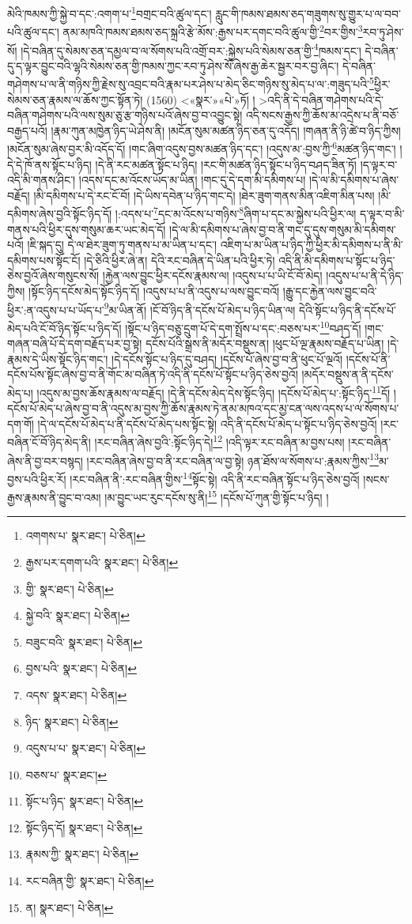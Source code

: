 མེའི་ཁམས་ཀྱི་སྐྱེ་བ་དང་:འགག་པ་\footnote{འགགས་པ་  སྣར་ཐང་།  པེ་ཅིན། }བགྲང་བའི་ཚུལ་དང་། རླུང་གི་ཁམས་ཐམས་ཅད་གཟུགས་སུ་གྱུར་པ་ལ་བབ་པའི་ཚུལ་དང་། ནམ་མཁའི་ཁམས་ཐམས་ཅད་སྐྲའི་རྩེ་མོས་:རྒྱས་པར་དགང་བའི་ཚུལ་གྱི་\footnote{རྒྱས་པར་དགག་པའི་  སྣར་ཐང་།  པེ་ཅིན། }བར་གྱིས་\footnote{གྱི་  སྣར་ཐང་།  པེ་ཅིན། }རབ་ཏུ་ཤེས་སོ། །དེ་བཞིན་དུ་སེམས་ཅན་དམྱལ་བ་ལ་སོགས་པའི་འགྲོ་བར་:སྐྱེས་པའི་སེམས་ཅན་གྱི་\footnote{སྐྱེ་བའི་  སྣར་ཐང་།  པེ་ཅིན། }ཁམས་དང་། དེ་བཞིན་དུ་ད་ལྟར་བྱུང་བའི་ལྷའི་སེམས་ཅན་གྱི་ཁམས་ཀྱང་རབ་ཏུ་ཤེས་སོ་ཞེས་རྒྱ་ཆེར་སྦྱར་བར་བྱ་ཞིང་། དེ་བཞིན་གཤེགས་པ་ལ་ནི་གཉིས་ཀྱི་རྗེས་སུ་འབྲང་བའི་རྣམ་པར་ཤེས་པ་མེད་ཅིང་གཉིས་སུ་མེད་པ་ལ་:གཟུད་པའི་\footnote{བཟུང་བའི་  སྣར་ཐང་།  པེ་ཅིན། }ཕྱིར་སེམས་ཅན་རྣམས་ལ་ཆོས་ཀྱང་སྟོན་ཏེ། (1560) <«སྣར་»«པེ་»ཏོ། །
 >འདི་ནི་དེ་བཞིན་གཤེགས་པའི་དེ་བཞིན་གཤེགས་པའི་ལས་སུམ་ཅུ་རྩ་གཉིས་པའོ་ཞེས་བྱ་བ་འབྱུང་སྟེ། འདི་སངས་རྒྱས་ཀྱི་ཆོས་མ་འདྲེས་པ་ནི་བཅོ་བརྒྱད་པའོ། །རྣམ་ཀུན་མཁྱེན་ཉིད་ཡེ་ཤེས་ནི། །མངོན་སུམ་མཚན་ཉིད་ཅན་དུ་འདོད། །གཞན་ནི་ཉི་ཚེ་བ་ཉིད་ཀྱིས། །མངོན་སུམ་ཞེས་བྱར་མི་འདོད་དོ། །གང་ཞིག་འདུས་བྱས་མཚན་ཉིད་དང་། །འདུས་མ་:བྱས་ཀྱི་\footnote{བྱས་པའི་  སྣར་ཐང་།  པེ་ཅིན། }མཚན་ཉིད་གང་། །དེ་དེ་ཁོ་ནས་སྟོང་པ་ཉིད། །དེ་ནི་རང་མཚན་སྟོང་པ་ཉིད། །རང་གི་མཚན་ཉིད་སྟོང་པ་ཉིད་བཤད་ཟིན་ཏོ། །ད་ལྟར་བ་འདི་མི་གནས་ཤིང་། །འདས་དང་མ་འོངས་ཡོད་མ་ཡིན། །གང་དུ་དེ་དག་མི་དམིགས་པ། །དེ་ལ་མི་དམིགས་པ་ཞེས་བརྗོད། །མི་དམིགས་པ་དེ་རང་ངོ་བོ། །དེ་ཡིས་དབེན་པ་ཉིད་གང་དེ། །ཐེར་ཟུག་གནས་མིན་འཇིག་མིན་པས། །མི་དམིགས་ཞེས་བྱའི་སྟོང་ཉིད་དོ། །:འདས་པ་\footnote{འདས་  སྣར་ཐང་།  པེ་ཅིན། }དང་མ་འོངས་པ་གཉིས་\footnote{ཉིད་  སྣར་ཐང་།  པེ་ཅིན། }ཞིག་པ་དང་མ་སྐྱེས་པའི་ཕྱིར་ལ། ད་ལྟར་བ་མི་གནས་པའི་ཕྱིར་དུས་གསུམ་ཆར་ཡང་མེད་དོ། །དེ་ལ་མི་དམིགས་པ་ཞེས་བྱ་བ་ནི་གང་དུ་དུས་གསུམ་མི་དམིགས་པའོ། །ཇི་སྐད་དུ། དེ་ལ་ཐེར་ཟུག་ཏུ་གནས་པ་མ་ཡིན་པ་དང་། འཇིག་པ་མ་ཡིན་པ་ཉིད་ཀྱི་ཕྱིར་མི་དམིགས་པ་ནི་མི་དམིགས་པས་སྟོང་ངོ། །དེ་ཅིའི་ཕྱིར་ཞེ་ན། དེའི་རང་བཞིན་དེ་ཡིན་པའི་ཕྱིར་ཏེ། འདི་ནི་མི་དམིགས་པ་སྟོང་པ་ཉིད་ཅེས་བྱའོ་ཞེས་གསུངས་སོ། །རྐྱེན་ལས་བྱུང་ཕྱིར་དངོས་རྣམས་ལ། །འདུས་པ་པ་ཡི་ངོ་བོ་མེད། །འདུས་པ་པ་ནི་དེ་ཉིད་ཀྱིས། །སྟོང་ཉིད་དངོས་མེད་སྟོང་ཉིད་དོ། །འདུས་པ་པ་ནི་འདུས་པ་ལས་བྱུང་བའོ། །རྒྱུ་དང་རྐྱེན་ལས་བྱུང་བའི་ཕྱིར་:ན་འདུས་པ་པ་ཡོད་པ་\footnote{འདུས་པ་པ་  སྣར་ཐང་།  པེ་ཅིན། }མ་ཡིན་ནོ། །ངོ་བོ་ཉིད་ནི་དངོས་པོ་མེད་པ་ཉིད་ཡིན་ལ། དེའི་སྟོང་པ་ཉིད་ནི་དངོས་པོ་མེད་པའི་ངོ་བོ་ཉིད་སྟོང་པ་ཉིད་དོ། །སྟོང་པ་ཉིད་བཅུ་དྲུག་པོ་དེ་དག་སྤྲོས་པ་དང་:བཅས་པར་\footnote{བཅས་པ་  སྣར་ཐང་། }བཤད་དོ། །གང་གཞན་བཞི་པོ་དེ་དག་བརྗོད་པར་བྱ་སྟེ། དངོས་པོའི་སྒྲས་ནི་མདོར་བསྡུས་ན། །ཕུང་པོ་ལྔ་རྣམས་བརྗོད་པ་ཡིན། །དེ་རྣམས་དེ་ཡིས་སྟོང་ཉིད་གང་། །དེ་དངོས་སྟོང་པ་ཉིད་དུ་བཤད། །དངོས་པོ་ཞེས་བྱ་བ་ནི་ཕུང་པོ་ལྔའོ། །དངོས་པོ་ནི་དངོས་པོས་སྟོང་ཞེས་བྱ་བ་ནི་གོང་མ་བཞིན་ཏེ་འདི་ནི་དངོས་པོ་སྟོང་པ་ཉིད་ཅེས་བྱའོ། །མདོར་བསྡུས་ན་ནི་དངོས་མེད་པ། །འདུས་མ་བྱས་ཆོས་རྣམས་ལ་བརྗོད། །དེ་ནི་དངོས་མེད་དེས་སྟོང་ཉིད། །དངོས་པོ་མེད་པ་:སྟོང་ཉིད་\footnote{སྟོང་པ་ཉིད་  སྣར་ཐང་།  པེ་ཅིན། }དོ། །དངོས་པོ་མེད་པ་ཞེས་བྱ་བ་ནི་འདུས་མ་བྱས་ཀྱི་ཆོས་རྣམས་ཏེ་ནམ་མཁའ་དང་མྱ་ངན་ལས་འདས་པ་ལ་སོགས་པ་དག་གོ། །དེ་ལ་དངོས་པོ་མེད་པ་ནི་དངོས་པོ་མེད་པས་སྟོང་སྟེ། འདི་ནི་དངོས་པོ་མེད་པ་སྟོང་པ་ཉིད་ཅེས་བྱའོ། །རང་བཞིན་ངོ་བོ་ཉིད་མེད་ནི། །རང་བཞིན་ཞེས་བྱའི་:སྟོང་ཉིད་དེ།\footnote{སྟོང་ཉིད་དོ།  སྣར་ཐང་།  པེ་ཅིན། } །འདི་ལྟར་རང་བཞིན་མ་བྱས་པས། །རང་བཞིན་ཞེས་ནི་བྱ་བར་བསྙད། །རང་བཞིན་ཞེས་བྱ་བ་ནི་རང་བཞིན་ལ་བྱ་སྟེ། ཉན་ཐོས་ལ་སོགས་པ་:རྣམས་ཀྱིས་\footnote{རྣམས་ཀྱི་  སྣར་ཐང་།  པེ་ཅིན། }མ་བྱས་པའི་ཕྱིར་རོ། །རང་བཞིན་ནི་:རང་བཞིན་གྱིས་\footnote{རང་བཞིན་གྱི་  སྣར་ཐང་།  པེ་ཅིན། }སྟོང་སྟེ། འདི་ནི་རང་བཞིན་སྟོང་པ་ཉིད་ཅེས་བྱའོ། །སངས་རྒྱས་རྣམས་ནི་བྱུང་བ་འམ། །མ་བྱུང་ཡང་རུང་དངོས་སུ་ནི།\footnote{ན།  སྣར་ཐང་།  པེ་ཅིན། } །དངོས་པོ་ཀུན་གྱི་སྟོང་པ་ཉིད། །
